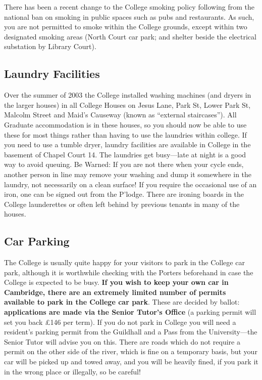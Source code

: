 \documentclass[11pt,fleqn, oneside]{book} %
\begin{document}
There has been a recent change to the College smoking policy following from the national ban on smoking in public spaces such as pubs and restaurants. As such, you are not permitted to smoke within the College grounds, except within two designated smoking areas (North Court car park; and shelter beside the electrical substation by Library Court).

\subsection{Laundry Facilities}

Over the summer of 2003 the College installed washing machines (and dryers in the larger houses) in all College Houses on Jesus Lane, Park St, Lower Park St, Malcolm Street and Maid’s Causeway (known as “external staircases”).  All Graduate accommodation is in these houses, so you should now be able to use these for most things rather than having to use the laundries within college.  If you need to use a tumble dryer, laundry facilities are available in College in the basement of Chapel Court 14. The laundries get busy—late at night is a good way to avoid queuing. Be Warned: If you are not there when your cycle ends, another person in line may remove your washing and dump it somewhere in the laundry, not necessarily on a clean surface! If you require the occasional use of an iron, one can be signed out from the P’lodge. There are ironing boards in the College launderettes or often left behind by previous tenants in many of the houses. 

\subsection{Car Parking}

The College is usually quite happy for your visitors to park in the College car park, although it is worthwhile checking with the Porters beforehand in case the College is expected to be busy. \textbf{If you wish to keep your own car in Cambridge, there are an extremely limited number of permits available to park in the College car park}. These are decided by ballot: \textbf{applications are made via the Senior Tutor's Office} (a parking permit will set you back £146 per term). If you do not park in College you will need a resident's parking permit from the Guildhall and a Pass from the University—the Senior Tutor will advise you on this. There are roads which do not require a permit on the other side of the river, which is fine on a temporary basis, but your car will be picked up and towed away, and you will be heavily fined, if you park it in the wrong place or illegally, so be careful!
\end{document}
